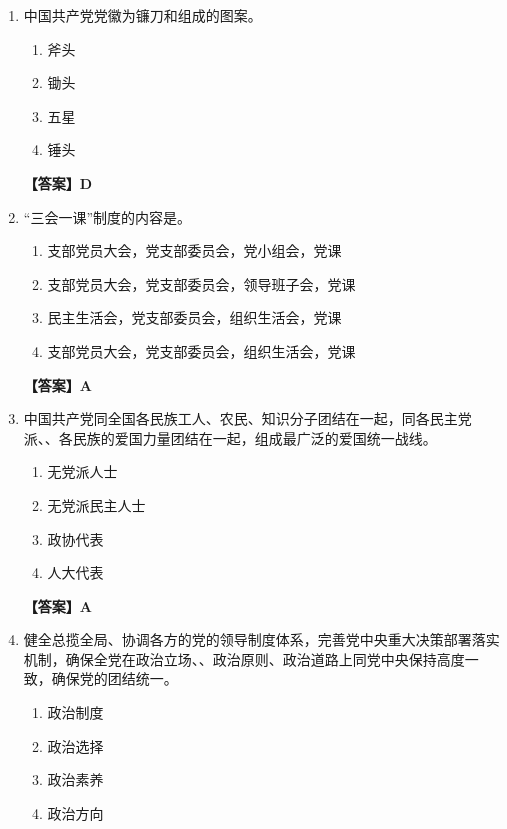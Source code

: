 \documentclass[UTF8,11pt,a4paper]{ctexart}
\begin{document}
\begin{enumerate}[label=\textbf{\arabic*.}, leftmargin=2.5em, itemsep=0.7em]
\begin{enumerate}[label=\Alph*., leftmargin=2em, itemsep=0.1em, topsep=0.15em]
\end{enumerate}
\textbf{【答案】A}
\item 中国共产党党徽为镰刀和\allowbreak\underline{\hspace{4em}}组成的图案。
\begin{enumerate}[label=\Alph*., leftmargin=2em, itemsep=0.1em, topsep=0.15em]
\item 斧头
\item 锄头
\item 五星
\item 锤头
\end{enumerate}
\textbf{【答案】D}
\item “三会一课”制度的内容是\allowbreak\underline{\hspace{4em}}。
\begin{enumerate}[label=\Alph*., leftmargin=2em, itemsep=0.1em, topsep=0.15em]
\item 支部党员大会，党支部委员会，党小组会，党课
\item 支部党员大会，党支部委员会，领导班子会，党课
\item 民主生活会，党支部委员会，组织生活会，党课
\item 支部党员大会，党支部委员会，组织生活会，党课
\end{enumerate}
\textbf{【答案】A}
\item 中国共产党同全国各民族工人、农民、知识分子团结在一起，同各民主党派、\allowbreak\underline{\hspace{4em}}、各民族的爱国力量团结在一起，组成最广泛的爱国统一战线。
\begin{enumerate}[label=\Alph*., leftmargin=2em, itemsep=0.1em, topsep=0.15em]
\item 无党派人士
\item 无党派民主人士
\item 政协代表
\item 人大代表
\end{enumerate}
\textbf{【答案】A}
\item 健全总揽全局、协调各方的党的领导制度体系，完善党中央重大决策部署落实机制，确保全党在政治立场、\allowbreak\underline{\hspace{4em}}、政治原则、政治道路上同党中央保持高度一致，确保党的团结统一。
\begin{enumerate}[label=\Alph*., leftmargin=2em, itemsep=0.1em, topsep=0.15em]
\item 政治制度
\item 政治选择
\item 政治素养
\item 政治方向

\end{enumerate}
\end{enumerate}
\end{document}
